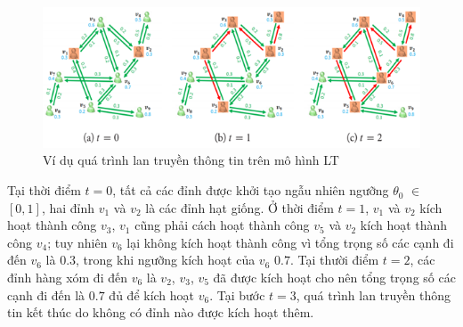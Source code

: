 	\begin{center}
		\begin{figure}[H]
			\begin{center}
				\includegraphics [scale=1]{picture/Hinh2_2}
			\end{center}
			\caption{Ví dụ quá trình lan truyền thông tin trên mô hình LT}
			\label{refhinh2_2}
		\end{figure}
	\end{center}
	
	Tại thời điểm $t$$=$$0$, tất cả các đỉnh được khởi tạo ngẫu nhiên ngưỡng $\theta$$_{0}$ $\in$ $[0,1]$, hai đỉnh $v$$_{1}$ và $v$$_{2}$ là các đỉnh hạt giống. Ở thời điểm $t = 1$, $v$$_{1}$ và $v$$_{2}$ kích hoạt thành công $v$$_{3}$, $v$$_{1}$ cũng phải cách hoạt thành công $v$$_{5}$ và $v$$_{2}$ kích hoạt thành công $v$$_{4}$; tuy nhiên $v$$_{6}$ lại không kích hoạt thành công vì tổng trọng số các cạnh đi đến $v$$_{6}$ là $0.3$, trong khi ngưỡng kích hoạt của $v$$_{6}$ $0.7$. Tại thười điểm $t = 2$, các đỉnh hàng xóm đi đến $v$$_{6}$ là $v$$_{2}$, $v$$_{3}$, $v$$_{5}$ đã được kích hoạt cho nên tổng trọng số các cạnh đi đến là $0.7$ đủ để kích hoạt $v$$_{6}$. Tại bước $t = 3$, quá trình lan truyền thông tin kết thúc do không có đỉnh nào được kích hoạt thêm.

